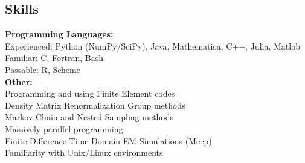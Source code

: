\documentclass[line, margin]{res3address}
\begin{document}
\begin{resume}
\section{Skills}
\textbf{Programming Languages:}\\
\phantom{4ex} Experienced: Python (NumPy/SciPy), Java, Mathematica, C++, Julia, Matlab\\
\phantom{4ex} Familiar: C, Fortran, Bash\\
\phantom{4ex} Passable: R, Scheme\\
\textbf{Other:}\\
\phantom{4ex} Programming and using Finite Element codes\\
\phantom{4ex} Density Matrix Renormalization Group methods\\
\phantom{4ex} Markov Chain and Nested Sampling methods\\
\phantom{4ex} Massively parallel programming\\
\phantom{4ex} Finite Difference Time Domain EM Simulations (Meep)\\
\phantom{4ex} Familiarity with Unix/Linux environments


\end{resume}
\end{document}
